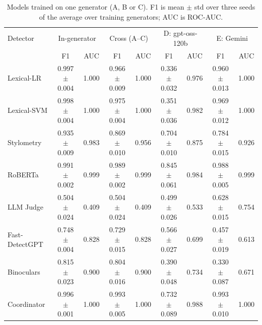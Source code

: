 \begin{table}[t]
\centering
\footnotesize
\caption{Models trained on one generator (A, B or C). F1 is mean $\pm$ std over three seeds of the average over training generators; AUC is ROC-AUC.}
\label{tab:main}
\begin{tabular}{lcccccccc}
\toprule
Detector & \multicolumn{2}{c}{In-generator} & \multicolumn{2}{c}{Cross (A--C)} & \multicolumn{2}{c}{D: gpt-oss-120b} & \multicolumn{2}{c}{E: Gemini} \\
 & F1 & AUC & F1 & AUC & F1 & AUC & F1 & AUC \\
\midrule
Lexical-LR & 0.997 $\pm$ 0.004 & 1.000 & 0.966 $\pm$ 0.009 & 1.000 & 0.336 $\pm$ 0.032 & 0.976 & 0.960 $\pm$ 0.013 & 1.000 \\
Lexical-SVM & 0.998 $\pm$ 0.004 & 1.000 & 0.975 $\pm$ 0.004 & 1.000 & 0.351 $\pm$ 0.036 & 0.982 & 0.969 $\pm$ 0.012 & 1.000 \\
Stylometry & 0.935 $\pm$ 0.009 & 0.983 & 0.869 $\pm$ 0.010 & 0.956 & 0.704 $\pm$ 0.010 & 0.875 & 0.784 $\pm$ 0.015 & 0.926 \\
RoBERTa & 0.991 $\pm$ 0.002 & 0.999 & 0.989 $\pm$ 0.002 & 0.999 & 0.845 $\pm$ 0.061 & 0.984 & 0.988 $\pm$ 0.005 & 0.999 \\
LLM Judge & 0.504 $\pm$ 0.024 & 0.409 & 0.504 $\pm$ 0.024 & 0.409 & 0.499 $\pm$ 0.026 & 0.533 & 0.628 $\pm$ 0.015 & 0.754 \\
Fast-DetectGPT & 0.748 $\pm$ 0.004 & 0.828 & 0.729 $\pm$ 0.015 & 0.828 & 0.566 $\pm$ 0.027 & 0.699 & 0.457 $\pm$ 0.019 & 0.613 \\
Binoculars & 0.815 $\pm$ 0.023 & 0.900 & 0.804 $\pm$ 0.016 & 0.900 & 0.390 $\pm$ 0.048 & 0.734 & 0.330 $\pm$ 0.087 & 0.671 \\
Coordinator & 0.996 $\pm$ 0.001 & 1.000 & 0.993 $\pm$ 0.005 & 1.000 & 0.732 $\pm$ 0.089 & 0.988 & 0.993 $\pm$ 0.010 & 1.000 \\
\bottomrule
\end{tabular}
\end{table}
